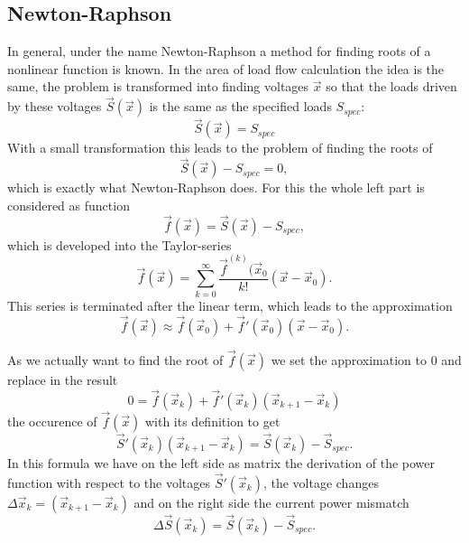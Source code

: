 \subsection{Newton-Raphson}
\label{sec:newton_raphson}
In general, under the name Newton-Raphson a method for finding roots of a nonlinear function is known. In the area of load flow calculation the idea is the same, the problem is transformed into finding voltages $\vec x$ so that the loads driven by these voltages $\vec S (\vec x)$ is the same as the specified loads $S_{spec}$:
\begin{equation}
	\vec S (\vec x) = S_{spec}
\end{equation}
With a small transformation this leads to the problem of finding the roots of
\begin{equation}
	\vec S (\vec x) - S_{spec} = 0,
\end{equation}
which is exactly what Newton-Raphson does. For this the whole left part is considered as function
\begin{equation}
	\vec f (\vec x) = \vec S (\vec x) - S_{spec},
\end{equation}
which is developed into the Taylor-series
\begin{equation}
	\vec f (\vec x) = \sum_{k = 0}^\infty \frac{\vec f^{(k)} (\vec x_0}{k!} \left( \vec x - \vec x_0 \right).
\end{equation}
This series is terminated after the linear term, which leads to the approximation
\begin{equation}
	\vec f (\vec x) \approx \vec f (\vec x_0) + \vec f' (\vec x_0) \left( \vec x - \vec x_0 \right).
\end{equation}

As we actually want to find the root of $\vec f (\vec x)$ we set the approximation to 0 and replace in the result
\begin{equation}
	0 = \vec f (\vec x_k) + \vec f' (\vec x_k) \left( \vec x_{k + 1} - \vec x_k \right)
\end{equation}
the occurence of $\vec f (\vec x)$ with its definition to get
\begin{equation}
	\vec S' (\vec x_k) \left( \vec x_{k + 1} - \vec x_k \right) = \vec S (\vec x_k) - \vec S_{spec}.
	\label{eq:newton_raphson_equation_system}
\end{equation}
In this formula we have on the left side as matrix the derivation of the power function with respect to the voltages $\vec S' (\vec x_k)$, the voltage changes $\Delta \vec x_k = \left( \vec x_{k + 1} - \vec x_k \right)$ and on the right side the current power mismatch 
\begin{equation}
	\Delta \vec S (\vec x_k) = \vec S (\vec x_k) - \vec S_{spec}.
	\label{eq:power_mismatch}
\end{equation}

